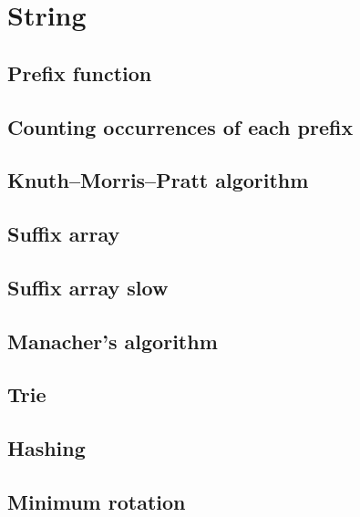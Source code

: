 \section{String}

\subsection{Prefix function}

\subsection{Counting occurrences of each prefix}

\subsection{Knuth–Morris–Pratt algorithm}

\subsection{Suffix array}

\subsection{Suffix array slow}

\subsection{Manacher's algorithm}

\subsection{Trie}

\subsection{Hashing}

\subsection{Minimum rotation}
